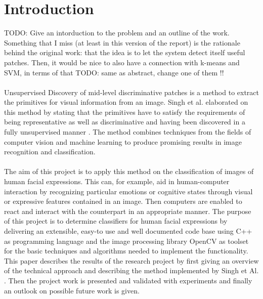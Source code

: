 
\section{Introduction}\label{sec:Introduction}

TODO: Give an intorduction to the problem and an outline of the work. Something that I miss (at least in this version of the report) is the rationale behind the original work: that the idea is to let the system detect itself useful patches. Then, it would be nice to also have a connection with k-means and SVM, in terms of that
TODO: same as abstract, change one of them !!
\\
\\
Unsupervised Discovery of mid-level discriminative patches is a method to extract the primitives for visual information from an image.  Singh et al. elaborated on this method by stating that the primitives have to satisfy the requirements of being representative as well as discriminative and having been discovered in a fully unsupervised manner \cite{Singh2012DiscPat}. The method combines techniques from the fields of computer vision and machine learning to produce promising results in image recognition and classification. 
\\
\\
The aim of this project is to apply this method on the classification of images of human facial expressions. This can, for example, aid in human-computer interaction by recognizing particular emotions or cognitive states through visual or expressive features contained in an image. Then computers are enabled to react and interact with the counterpart in an appropriate manner. The purpose of this project is to determine classifiers for human facial expressions by delivering an extensible, easy-to use and well documented code base using C++ as programming language and the image processing library OpenCV as toolset for the basic techniques and algorithms needed to implement the functionality. This paper describes the results of the research project by first giving an overview of the technical approach and describing the method implemented by Singh et Al. \cite{Singh2012DiscPat}. Then the project work is presented and validated with experiments and finally an outlook on possible future work is given.